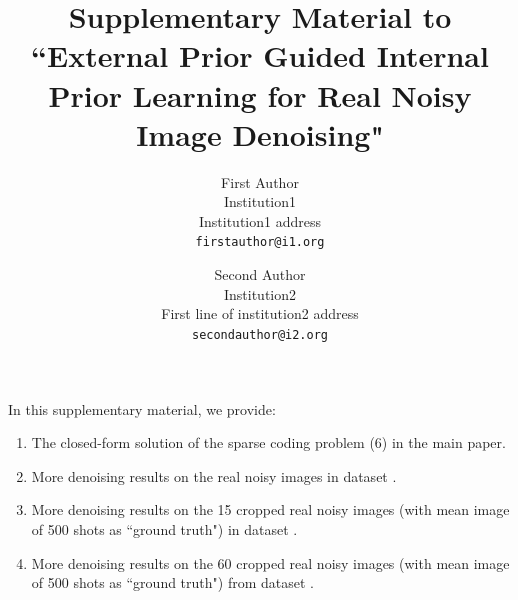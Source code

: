 \documentclass[10pt,onecolumn,letterpaper]{article}
\begin{document}
\title{Supplementary Material to ``External Prior Guided Internal Prior Learning for Real Noisy Image Denoising"}

\author{First Author\\
Institution1\\
Institution1 address\\
{\tt\small firstauthor@i1.org}
\and
Second Author\\
Institution2\\
First line of institution2 address\\
{\tt\small secondauthor@i2.org}
}

\maketitle

\vspace{-3mm}
In this supplementary material, we provide:\vspace{-0.1in}
\begin{enumerate}
\item The closed-form solution of the sparse coding problem (6) in the main paper.
\vspace{-3mm}
\item More denoising results on the real noisy images in dataset \cite{ncwebsite}.
\vspace{-3mm}
\item More denoising results on the 15 cropped real noisy images (with mean image of 500 shots as ``ground truth") in dataset \cite{crosschannel2016}.
\vspace{-3mm}
\item More denoising results on the 60 cropped real noisy images (with mean image of 500 shots as ``ground truth") from dataset \cite{crosschannel2016}.
\end{enumerate}
\end{document}
